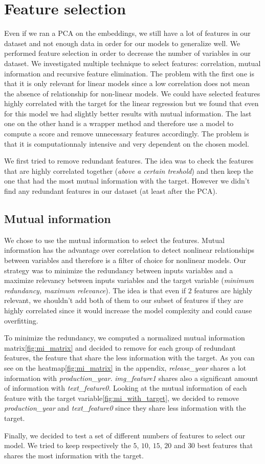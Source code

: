 \section{Feature selection}

Even if we ran a PCA on the embeddings, we still have a lot of features in our dataset and not enough data in order for our models to generalize well. We performed feature selection in order to decrease the number of variables in our dataset. We investigated multiple technique to select features: correlation, mutual information and recursive feature elimination. The problem with the first one is that it is only relevant for linear models since a low correlation does not mean the absence of relationship for non-linear models. We could have selected features highly correlated with the target for the linear regression but we found that even for this model we had slightly better results with mutual information. The last one on the other hand is a wrapper method and therefore use a model to compute a score and remove unnecessary features accordingly. The problem is that it is computationnaly intensive and very dependent on the chosen model.

We first tried to remove redundant features. The idea was to check the features that are highly correlated together (\textit{above a certain treshold}) and then keep the one that had the most mutual information with the target. However we didn't find any redundant features in our dataset (at least after the PCA).

\subsection{Mutual information}

We chose to use the mutual information to select the features. Mutual information has the advantage over correlation to detect nonlinear relationships between variables and therefore is a filter of choice for nonlinear models. Our strategy was to minimize the redundancy between inputs variables and a maximize relevancy between inputs variables and the target variable (\textit{minimum redundancy, maximum relevance}). The idea is that even if $2$ features are highly relevant, we shouldn't add both of them to our subset of features if they are highly correlated since it would increase the model complexity and could cause overfitting.

To minimize the redundancy, we computed a normalized mutual information matrix\ref{fig:mi_matrix} and decided to remove for each group of redundant features, the feature that share the less information with the target. As you can see on the heatmap\ref{fig:mi_matrix} in the appendix, \textit{release\_year} shares a lot information with \textit{production\_year}. \textit{img\_feature1} shares also a significant amount of information with \textit{text\_feature0}. Looking at the mutual information of each feature with the target variable\ref{fig:mi_with_target}, we decided to remove \textit{production\_year} and \textit{text\_feature0} since they share less information with the target.

Finally, we decided to test a set of different numbers of features to select our model. We tried to keep respectively the $5$, $10$, $15$, $20$ and $30$ best features that shares the most information with the target.